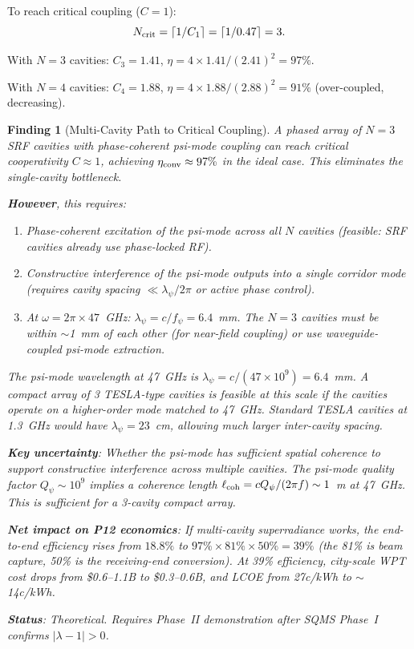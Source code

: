 \documentclass[11pt]{article}
\newtheorem{finding}{Finding}
\newcommand{\ee}[1]{\times 10^{#1}}
\newcommand{\lambdaone}{|\lambda{-}1|}
\newcommand{\Qpsi}{Q_\psi}
\begin{document}
To reach critical coupling ($C = 1$):
\begin{equation}
N_{\rm crit} = \lceil 1/C_1 \rceil = \lceil 1/0.47 \rceil = 3.
\end{equation}

With $N = 3$ cavities: $C_3 = 1.41$, $\eta = 4\times1.41/(2.41)^2
= 97\%$.

With $N = 4$ cavities: $C_4 = 1.88$, $\eta = 4\times1.88/(2.88)^2
= 91\%$ (over-coupled, decreasing).

\begin{finding}[Multi-Cavity Path to Critical Coupling]
\label{find:multi-cavity}
A phased array of $N = 3$ SRF cavities with phase-coherent psi-mode
coupling can reach critical cooperativity $C \approx 1$, achieving
$\eta_{\rm conv} \approx 97\%$ in the ideal case. This eliminates the
single-cavity bottleneck.

\textbf{However}, this requires:
\begin{enumerate}[nosep]
\item Phase-coherent excitation of the psi-mode across all $N$ cavities
  (feasible: SRF cavities already use phase-locked RF).
\item Constructive interference of the psi-mode outputs into a single
  corridor mode (requires cavity spacing $\ll \lambda_\psi/2\pi$ or
  active phase control).
\item At $\omega = 2\pi\times 47$~GHz: $\lambda_\psi = c/f_\psi =
  6.4$~mm. The $N = 3$ cavities must be within $\sim$1~mm of each other
  (for near-field coupling) or use waveguide-coupled psi-mode
  extraction.
\end{enumerate}

The psi-mode wavelength at 47~GHz is $\lambda_\psi = c/(47\ee{9})
= 6.4$~mm. A compact array of 3 TESLA-type cavities is feasible at
this scale if the cavities operate on a higher-order mode matched to
47~GHz. Standard TESLA cavities at 1.3~GHz would have
$\lambda_\psi = 23$~cm, allowing much larger inter-cavity spacing.

\textbf{Key uncertainty}: Whether the psi-mode has sufficient spatial
coherence to support constructive interference across multiple cavities.
The psi-mode quality factor $\Qpsi \sim 10^9$ implies a coherence
length $\ell_{\rm coh} = c\Qpsi/(2\pi f) \sim 1$~m at 47~GHz. This
is sufficient for a 3-cavity compact array.

\textbf{Net impact on P12 economics}: If multi-cavity superradiance
works, the end-to-end efficiency rises from $18.8\%$ to
$97\% \times 81\% \times 50\% = 39\%$ (the 81\% is beam capture,
50\% is the receiving-end conversion). At 39\% efficiency, city-scale
WPT cost drops from \$0.6--1.1B to \$0.3--0.6B, and LCOE from
27c/kWh to $\sim$14c/kWh.

\textbf{Status}: Theoretical. Requires Phase~II demonstration after
SQMS Phase~I confirms $\lambdaone > 0$.
\end{finding}
\end{document}
